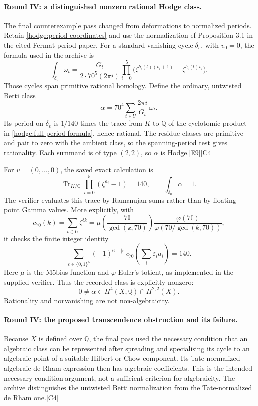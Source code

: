\documentclass[11pt]{article}
\newcommand{\Q}{\mathbb Q}
\newcommand{\Tr}{\operatorname{Tr}}
\newcommand{\src}[1]{\hyperlink{src:#1}{[#1]}}
\begin{document}
\paragraph{Round IV: a distinguished nonzero rational Hodge class.}
The final counterexample pass changed from deformations to normalized
periods. Retain \eqref{hodge:period-coordinates} and use the normalization of
Proposition 3.1 in the cited Fermat period paper. For a standard vanishing
cycle $\delta_v$, with $v_0=0$, the formula used in the archive is
\begin{equation}\label{hodge:full-period-formula}
 \int_{\delta_v}\omega_t
 =\frac{G_t}{2\cdot70^5(2\pi i)}
   \prod_{i=0}^{5}
   \bigl(\zeta^{b_i(t)(v_i+1)}-\zeta^{b_i(t)v_i}\bigr).
\end{equation}
Those cycles span primitive rational homology. Define the ordinary,
untwisted Betti class
\begin{equation}\label{hodge:explicit-alpha}
 \boxed{\quad
 \alpha=70^4\sum_{t\in U}\frac{2\pi i}{G_t}\,\omega_t.
 \quad}
\end{equation}
Its period on $\delta_v$ is $1/140$ times the trace from $K$ to $\Q$ of the
cyclotomic product in \eqref{hodge:full-period-formula}, hence rational.
The residue classes are primitive and pair to zero with the ambient class,
so the spanning-period test gives rationality. Each summand is of type
$(2,2)$, so $\alpha$ is Hodge.\src{E9}\src{C4}

For $v=(0,\ldots,0)$, the saved exact calculation is
\begin{equation}\label{hodge:trace-normalization}
 \Tr_{K/\Q}\prod_{i=0}^{5}(\zeta^{a_i}-1)=140,
 \qquad \int_{\delta_0}\alpha=1.
\end{equation}
The verifier evaluates this trace by Ramanujan sums rather than by
floating-point Gamma values. More explicitly, with
\[
 c_{70}(k)=\sum_{t\in U}\zeta^{tk}
 =\mu\left(\frac{70}{\gcd(k,70)}\right)
   \frac{\varphi(70)}{\varphi(70/\gcd(k,70))},
\]
it checks the finite integer identity
\[
 \sum_{\varepsilon\in\{0,1\}^6}
 (-1)^{6-|\varepsilon|}
 c_{70}\left(\sum_i\varepsilon_i a_i\right)=140.
\]
Here $\mu$ is the M\"obius function and $\varphi$ Euler's totient, as
implemented in the supplied verifier. Thus the recorded class is explicitly
nonzero:
\[
 0\ne\alpha\in H^4(X,\Q)\cap H^{2,2}(X).
\]
Rationality and nonvanishing are not non-algebraicity.

\paragraph{Round IV: the proposed transcendence obstruction and its failure.}
Because $X$ is defined over $\Q$, the final pass used the necessary condition
that an algebraic class can be represented after spreading and specializing
its cycle to an algebraic point of a suitable Hilbert or Chow component.
Its Tate-normalized algebraic de Rham expression then has algebraic
coefficients. This is the intended necessary-condition argument, not a
sufficient criterion for algebraicity. The archive distinguishes the
untwisted Betti normalization from the Tate-normalized de Rham one.\src{C4}
\end{document}
